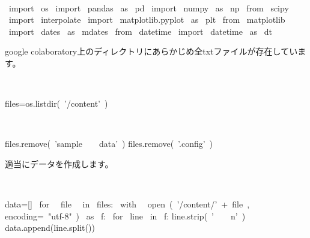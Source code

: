\begin{paracol}{2}
\smallskip
\begin{cellExecute}[escapechar=~]
~~
\end{cellExecute}
\switchcolumn
\begin{codeCell}[escapechar=~]
~\textcolor{mtk17}{import}~ os 
~\textcolor{mtk17}{import}~ pandas ~\textcolor{mtk17}{as}~ pd
~\textcolor{mtk17}{import}~ numpy ~\textcolor{mtk17}{as}~ np
~\textcolor{mtk17}{from}~ scipy ~\textcolor{mtk17}{import}~ interpolate 
~\textcolor{mtk17}{import}~ matplotlib.pyplot ~\textcolor{mtk17}{as}~ plt
~\textcolor{mtk17}{from}~ matplotlib ~\textcolor{mtk17}{import}~ dates ~\textcolor{mtk17}{as}~ mdates
~\textcolor{mtk17}{from}~ datetime ~\textcolor{mtk17}{import}~ datetime ~\textcolor{mtk17}{as}~ dt
\end{codeCell}
\end{paracol}
\par google colaboratory上のディレクトリにあらかじめ全txtファイルが存在しています。

\begin{paracol}{2}
\smallskip
\begin{cellExecute}[escapechar=~]
~~
\end{cellExecute}
\switchcolumn
\begin{codeCell}[escapechar=~]
files=os.listdir(~\textcolor{mtk25}{'/content'}~)
\end{codeCell}
\end{paracol}

\begin{paracol}{2}
\smallskip
\begin{cellExecute}[escapechar=~]
~~
\end{cellExecute}
\switchcolumn
\begin{codeCell}[escapechar=~]
files.remove(~\textcolor{mtk25}{'sample}~~~~\textcolor{mtk25}{data'}~)
files.remove(~\textcolor{mtk25}{'.config'}~)
\end{codeCell}
\end{paracol}
\par 適当にデータを作成します。

\begin{paracol}{2}
\smallskip
\begin{cellExecute}[escapechar=~]
~~
\end{cellExecute}
\switchcolumn
\begin{codeCell}[escapechar=~]
data=[]
~\textcolor{mtk17}{for}~ ~\textcolor{mtk14}{file}~ ~\textcolor{mtk6}{in}~ files:
  ~\textcolor{mtk17}{with}~ ~\textcolor{mtk13}{open}~(~\textcolor{mtk25}{'/content/'}~+~\textcolor{mtk14}{file}~, encoding=~\textcolor{mtk25}{"utf-8"}~) ~\textcolor{mtk17}{as}~ f:
    ~\textcolor{mtk17}{for}~ line ~\textcolor{mtk6}{in}~ f:
      line.strip(~\textcolor{mtk25}{'}~~~~\textcolor{mtk25}{n'}~)
      data.append(line.split())
\end{codeCell}
\end{paracol}

